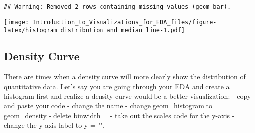 \documentclass[]{article}
\newenvironment{Shaded}{\begin{snugshade}}{\end{snugshade}}
\newcommand{\DataTypeTok}[1]{\textcolor[rgb]{0.13,0.29,0.53}{#1}}
\newcommand{\DecValTok}[1]{\textcolor[rgb]{0.00,0.00,0.81}{#1}}
\newcommand{\KeywordTok}[1]{\textcolor[rgb]{0.13,0.29,0.53}{\textbf{#1}}}
\newcommand{\NormalTok}[1]{#1}
\newcommand{\OperatorTok}[1]{\textcolor[rgb]{0.81,0.36,0.00}{\textbf{#1}}}
\newcommand{\StringTok}[1]{\textcolor[rgb]{0.31,0.60,0.02}{#1}}
\begin{document}
\begin{verbatim}
## Warning: Removed 2 rows containing missing values (geom_bar).
\end{verbatim}

\texttt{[image: Introduction\_to\_Visualizations\_for\_EDA\_files/figure-latex/histogram distribution and median line-1.pdf]}

\hypertarget{density-curve}{%
\subsection{Density Curve}\label{density-curve}}

There are times when a density curve will more clearly show the
distribution of quantitative data. Let's say you are going through your
EDA and create a histogram first and realize a density curve would be a
better visualization: - copy and paste your code - change the name -
change geom\_histogram to geom\_density - delete binwidth = - take out
the scales code for the y-axis - change the y-axis label to y = "".

\begin{Shaded}
\end{Shaded}
\end{document}
